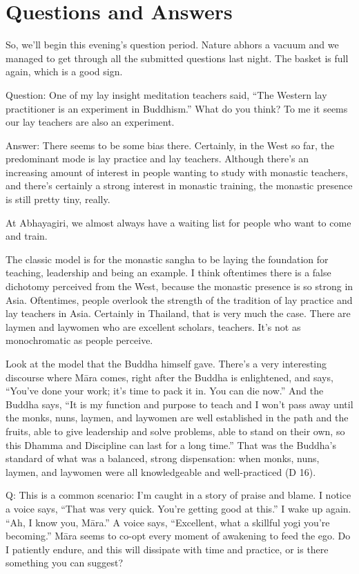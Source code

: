 \chapter{Questions and Answers}

So, we’ll begin this evening’s question period. Nature abhors a vacuum
and we managed to get through all the submitted questions last night.
The basket is full again, which is a good sign.

\qaspace
Question: One of my lay insight meditation teachers said, “The Western
lay practitioner is an experiment in Buddhism.” What do you think? To me
it seems our lay teachers are also an experiment.

\qaspace
Answer: There seems to be some bias there. Certainly, in the West so
far, the predominant mode is lay practice and lay teachers. Although
there’s an increasing amount of interest in people wanting to study with
monastic teachers, and there’s certainly a strong interest in monastic
training, the monastic presence is still pretty tiny, really.

At Abhayagiri, we almost always have a waiting list for people who want
to come and train.

The classic model is for the monastic sangha to be laying the foundation
for teaching, leadership and being an example. I think oftentimes there
is a false dichotomy perceived from the West, because the monastic
presence is so strong in Asia. Oftentimes, people overlook the strength
of the tradition of lay practice and lay teachers in Asia. Certainly in
Thailand, that is very much the case. There are laymen and laywomen who
are excellent scholars, teachers. It’s not as monochromatic as people
perceive.

Look at the model that the Buddha himself gave. There’s a very
interesting discourse where Māra comes, right after the Buddha is
enlightened, and says, “You’ve done your work; it’s time to pack it in.
You can die now.” And the Buddha says, “It is my function and purpose to
teach and I won’t pass away until the monks, nuns, laymen, and laywomen
are well established in the path and the fruits, able to give leadership
and solve problems, able to stand on their own, so this Dhamma and
Discipline can last for a long time.” That was the Buddha’s standard of
what was a balanced, strong dispensation: when monks, nuns, laymen, and
laywomen were all knowledgeable and well-practiced (D 16).

\qaspace
Q: This is a common scenario: I’m caught in a story of praise and blame.
I notice a voice says, “That was very quick. You’re getting good at
this.” I wake up again. “Ah, I know you, Māra.” A voice says,
“Excellent, what a skillful yogi you’re becoming.” Māra seems to co-opt
every moment of awakening to feed the ego. Do I patiently endure, and
this will dissipate with time and practice, or is there something you
can suggest?

